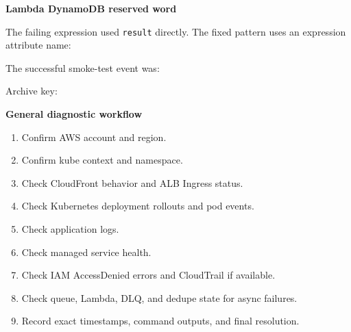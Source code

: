 \vspace{0.5em}\noindent\textbf{Lambda DynamoDB reserved
word}\par

The failing expression used \texttt{result} directly. The fixed pattern
uses an expression attribute name:

\begin{Shaded}
\begin{Highlighting}[]
\FunctionTok{\{}
  \FunctionTok{:} \FunctionTok{,}
  \FunctionTok{:} \FunctionTok{\{}
    \FunctionTok{:} 
  \FunctionTok{\}}
\FunctionTok{\}}
\end{Highlighting}
\end{Shaded}

The successful smoke-test event was:

\begin{Shaded}
\begin{Highlighting}[]
\end{Highlighting}
\end{Shaded}

Archive key:

\begin{Shaded}
\begin{Highlighting}[]
\end{Highlighting}
\end{Shaded}

\vspace{0.5em}\noindent\textbf{General diagnostic
workflow}\par

\begin{enumerate}
\def\labelenumi{\arabic{enumi}.}
\tightlist
\item
  Confirm AWS account and region.
\item
  Confirm kube context and namespace.
\item
  Check CloudFront behavior and ALB Ingress status.
\item
  Check Kubernetes deployment rollouts and pod events.
\item
  Check application logs.
\item
  Check managed service health.
\item
  Check IAM AccessDenied errors and CloudTrail if available.
\item
  Check queue, Lambda, DLQ, and dedupe state for async failures.
\item
  Record exact timestamps, command outputs, and final resolution.
\end{enumerate}

